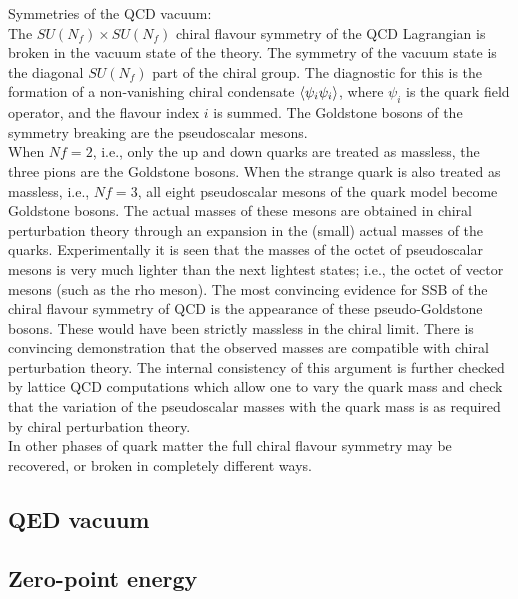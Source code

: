 Symmetries of the QCD vacuum:\\
The $SU(N_f) \times SU(N_f)$ chiral flavour symmetry of the QCD Lagrangian is broken in the vacuum state of the theory. The symmetry of the vacuum state is the diagonal $SU(N_f)$ part of the chiral group. The diagnostic for this is the formation of a non-vanishing chiral condensate $\expval{\psi_i\psi_i}$, where $\psi_i$ is the quark field operator, and the flavour index $i$ is summed. The Goldstone bosons of the symmetry breaking are the pseudoscalar mesons.\\
When $Nf = 2$, i.e., only the up and down quarks are treated as massless, the three pions are the Goldstone bosons. When the strange quark is also treated as massless, i.e., $Nf = 3$, all eight pseudoscalar mesons of the quark model become Goldstone bosons. The actual masses of these mesons are obtained in chiral perturbation theory through an expansion in the (small) actual masses of the quarks. Experimentally it is seen that the masses of the octet of pseudoscalar mesons is very much lighter than the next lightest states; i.e., the octet of vector mesons (such as the rho meson). The most convincing evidence for SSB of the chiral flavour symmetry of QCD is the appearance of these pseudo-Goldstone bosons. These would have been strictly massless in the chiral limit. There is convincing demonstration that the observed masses are compatible with chiral perturbation theory. The internal consistency of this argument is further checked by lattice QCD computations which allow one to vary the quark mass and check that the variation of the pseudoscalar masses with the quark mass is as required by chiral perturbation theory.\\
In other phases of quark matter the full chiral flavour symmetry may be recovered, or broken in completely different ways.














\subsection{QED vacuum}
\subsection{Zero-point energy}


